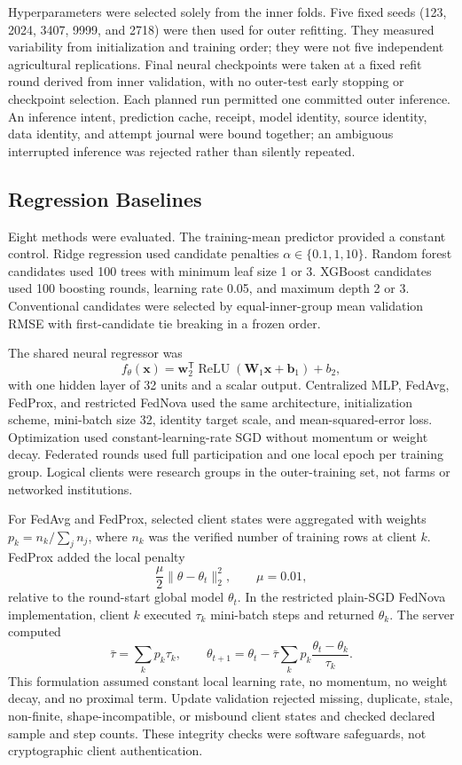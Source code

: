 \documentclass[journal]{IEEEtran}
\begin{document}
Hyperparameters were selected solely from the inner folds. Five fixed seeds
(123, 2024, 3407, 9999, and 2718) were then used for outer refitting. They
measured variability from initialization and training order; they were not five
independent agricultural replications. Final neural checkpoints were taken at a
fixed refit round derived from inner validation, with no outer-test early
stopping or checkpoint selection. Each planned run permitted one committed outer
inference. An inference intent, prediction cache, receipt, model identity,
source identity, data identity, and attempt journal were bound together; an
ambiguous interrupted inference was rejected rather than silently repeated.

\subsection{Regression Baselines}

Eight methods were evaluated. The training-mean predictor provided a constant
control. Ridge regression used candidate penalties
$\alpha \in \{0.1, 1, 10\}$. Random forest candidates used 100 trees with
minimum leaf size 1 or 3. XGBoost candidates used 100 boosting rounds, learning
rate 0.05, and maximum depth 2 or 3. Conventional candidates were selected by
equal-inner-group mean validation RMSE with first-candidate tie breaking in a
frozen order.

The shared neural regressor was
\[
  f_{\theta}(\mathbf{x}) = \mathbf{w}_2^{\mathsf{T}}
  \operatorname{ReLU}(\mathbf{W}_1 \mathbf{x} + \mathbf{b}_1) + b_2,
\]
with one hidden layer of 32 units and a scalar output. Centralized MLP, FedAvg,
FedProx, and restricted FedNova used the same architecture, initialization
scheme, mini-batch size 32, identity target scale, and mean-squared-error loss.
Optimization used constant-learning-rate SGD without momentum or weight decay.
Federated rounds used full participation and one local epoch per training group.
Logical clients were research groups in the outer-training set, not farms or
networked institutions.

For FedAvg and FedProx, selected client states were aggregated with weights
$p_k = n_k / \sum_j n_j$, where $n_k$ was the verified number of training rows
at client $k$. FedProx added the local penalty
\[
  \frac{\mu}{2}\lVert\theta - \theta_t\rVert_2^2, \qquad \mu = 0.01,
\]
relative to the round-start global model $\theta_t$. In the restricted
plain-SGD FedNova implementation, client $k$ executed $\tau_k$ mini-batch steps
and returned $\theta_k$. The server computed
\[
  \bar{\tau} = \sum_k p_k \tau_k, \qquad
  \theta_{t+1} = \theta_t - \bar{\tau} \sum_k p_k
  \frac{\theta_t - \theta_k}{\tau_k}.
\]
This formulation assumed constant local learning rate, no momentum, no weight
decay, and no proximal term. Update validation rejected missing, duplicate,
stale, non-finite, shape-incompatible, or misbound client states and checked
declared sample and step counts. These integrity checks were software safeguards,
not cryptographic client authentication.
\end{document}
